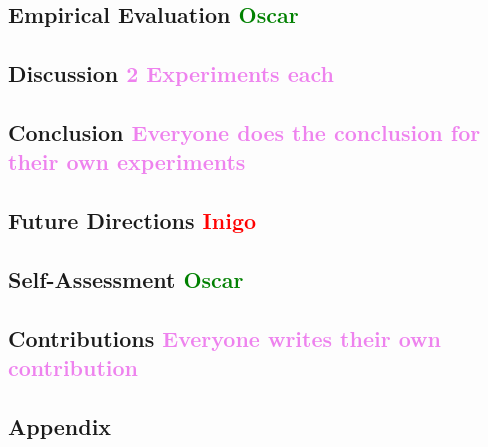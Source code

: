 \documentclass[12pt, letterpaper]{article}
\begin{document}
\subsection*{Empirical Evaluation \textcolor{green}{Oscar}}
\subsection*{Discussion \textcolor{violet}{2 Experiments each}}
\subsection*{Conclusion \textcolor{violet}{Everyone does the conclusion for their own experiments}}
\subsection*{Future Directions \textcolor{red}{Inigo}}
\subsection*{Self-Assessment \textcolor{green}{Oscar}}
\subsection*{Contributions \textcolor{violet}{Everyone writes their own contribution}}

\pagebreak
\subsection*{Appendix}
\printbibliography
\end{document}
